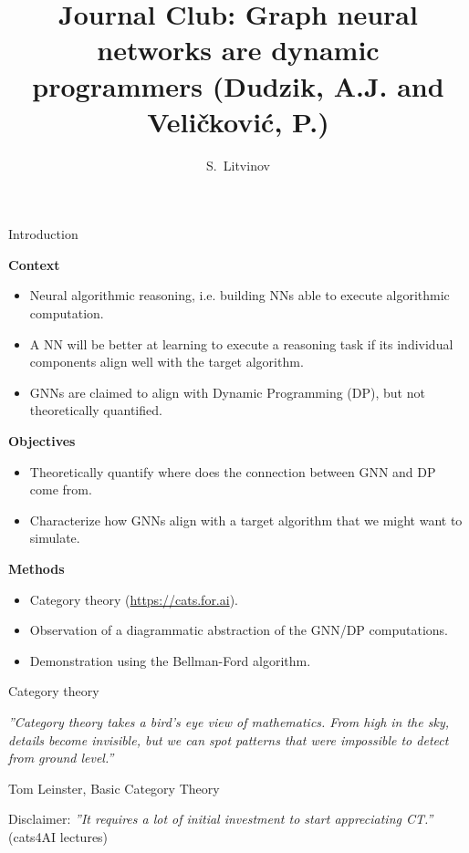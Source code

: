 \documentclass[10pt,aspectratio=169]{beamer}
\title[]{\Large Journal Club: Graph neural networks are dynamic programmers (Dudzik, A.J. and Veli\v{c}kovi\'{c}, P.)}
\author{\large S.~Litvinov}
\begin{document}
\begin{frame}
  \titlepage
\end{frame}
\begin{frame}{Introduction}

\textbf{Context}
\begin{itemize}
  \item Neural algorithmic reasoning, i.e. building NNs able to execute algorithmic computation.
  \item A NN will be better at learning to execute a reasoning task if its individual components align well with the target algorithm.
  \item GNNs are claimed to align with Dynamic Programming (DP), but not theoretically quantified.
\end{itemize}

\textbf{Objectives}
\begin{itemize}
  \item Theoretically quantify where does the connection between GNN and DP come from.
  \item Characterize how GNNs align with a target algorithm that we might want to simulate.
\end{itemize}

\textbf{Methods}
\begin{itemize}
  \item Category theory (\url{https://cats.for.ai}).
  \item Observation of a diagrammatic abstraction of the GNN/DP computations.
  \item Demonstration using the Bellman-Ford algorithm.
\end{itemize}

\end{frame}





\begin{frame}{Category theory}

\textit{''Category theory takes a bird's eye view of mathematics. From high in the sky, details become invisible, but we can spot patterns that were impossible to detect from ground level.''}

Tom Leinster, Basic Category Theory

\vspace{2ex}
Disclaimer: \textit{''It requires a lot of initial investment to start appreciating CT.''} (cats4AI lectures)


\end{frame}
\end{document}
